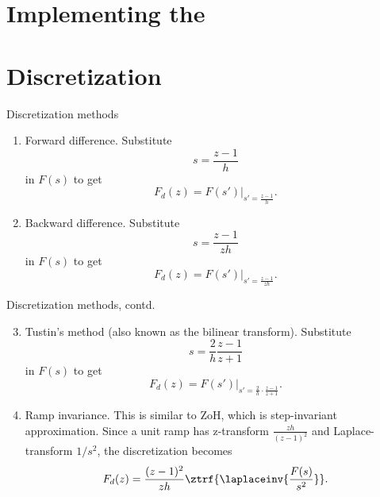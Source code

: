 \documentclass[presentation,aspectratio=1610]{beamer}
\begin{document}
\section{Implementing the}
\label{sec:org6dea8f3}
\section{Discretization}
\label{sec:org49d922d}
\begin{frame}[label={sec:org2985245}]{Discretization methods}
\begin{enumerate}
\item Forward difference. Substitute 
\[ s = \frac{z-1}{h} \] in \(F(s)\) to get
\[ F_d(z) = F(s')|_{s'=\frac{z-1}{h}}. \]
\item Backward difference. Substitute 
\[ s = \frac{z-1}{zh} \] in \(F(s)\) to get
\[ F_d(z) = F(s')|_{s'=\frac{z-1}{zh}}. \]
\end{enumerate}
\end{frame}
\begin{frame}[label={sec:orge7a582c}]{Discretization methods, contd.}
\begin{enumerate}
\setcounter{enumi}{2}
\item Tustin's method (also known as the bilinear transform). Substitute
\[ s = \frac{2}{h}\frac{z-1}{z+1} \] in \(F(s)\) to get
\[ F_d(z) = F(s')|_{s'=\frac{2}{h}\cdot \frac{z-1}{z+1}}. \]
\item Ramp invariance. This is similar to ZoH, which is step-invariant approximation. 
Since a unit ramp has z-transform \(\frac{zh}{(z-1)^2}\) and Laplace-transform \(1/s^2\),  the discretization becomes
\[ F_d(z) = \frac{(z-1)^2}{zh} \ztrf{\laplaceinv{\frac{F(s)}{s^2}}}. \]
\end{enumerate}
\end{frame}
\end{document}

